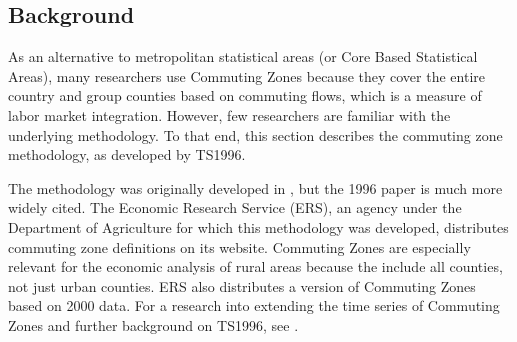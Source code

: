 \subsection{Background}

As an alternative to metropolitan statistical areas (or Core Based Statistical Areas), many researchers use Commuting Zones because they cover the entire country and group counties based on commuting flows, which is a measure of labor market integration. However, few researchers are familiar with the underlying methodology. To that end, this section describes the commuting zone  methodology, as developed by TS1996. 

The methodology was  originally developed in \citet{TK1987}, but the 1996 paper is much more widely cited. The Economic Research Service (ERS), an agency under the Department of Agriculture for which this methodology was developed, distributes commuting zone definitions on its website. Commuting Zones are especially relevant for the economic analysis of rural areas because the include all counties, not just urban counties. ERS also distributes a version of Commuting Zones based on 2000 data. For a research into extending the time series of Commuting Zones and further background on TS1996, see \cite{FowlerRhubartJensen2016}.

